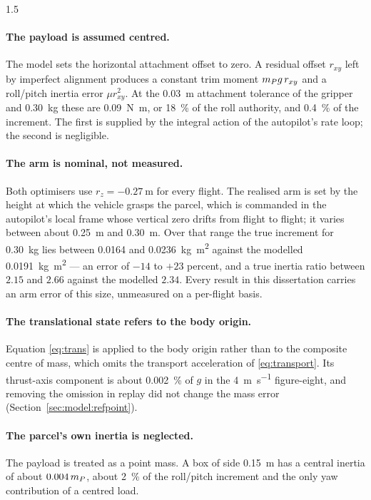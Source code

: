 \begin{spacing}{1.5}
\paragraph{The payload is assumed centred.} The model sets the horizontal
attachment offset to zero. A residual offset $r_{xy}$ left by imperfect
alignment produces a constant trim moment $m_P g\, r_{xy}$ and a roll/pitch
inertia error $\mu r_{xy}^2$. At the \SI{0.03}{\meter} attachment tolerance of
the gripper and \SI{0.30}{\kg} these are \SI{0.09}{\newton\meter}, or
\SI{18}{\percent} of the roll authority, and \SI{0.4}{\percent} of the
increment. The first is supplied by the integral action of the autopilot's rate
loop; the second is negligible.

\paragraph{The arm is nominal, not measured.} Both optimisers use
$r_z=\SI{-0.27}{\meter}$ for every flight. The realised arm is set by the height
at which the vehicle grasps the parcel, which is commanded in the autopilot's
local frame whose vertical zero drifts from flight to flight; it varies between
about \SI{0.25}{\meter} and \SI{0.30}{\meter}. Over that range the true increment
for \SI{0.30}{\kg} lies between \SI{0.0164}{} and
\SI{0.0236}{\kg\meter\squared} against the modelled
\SI{0.0191}{\kg\meter\squared} --- an error of $-14$ to $+23$ percent, and a
true inertia ratio between $2.15$ and $2.66$ against the modelled $2.34$. Every
result in this dissertation carries an arm error of this size, unmeasured on a
per-flight basis.

\paragraph{The translational state refers to the body origin.} Equation
\eqref{eq:trans} is applied to the body origin rather than to the composite
centre of mass, which omits the transport acceleration of \eqref{eq:transport}.
Its thrust-axis component is about \SI{0.002}{\percent} of $g$ in the
\SI{4}{\meter\per\second} figure-eight, and removing the omission in replay did
not change the mass error (Section~\ref{sec:model:refpoint}).

\paragraph{The parcel's own inertia is neglected.} The payload is treated as a
point mass. A box of side \SI{0.15}{\meter} has a central inertia of about
$0.004\,m_P$, about \SI{2}{\percent} of the roll/pitch increment and the only
yaw contribution of a centred load.


\end{spacing}
